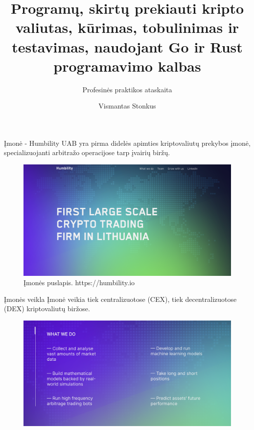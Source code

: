 \documentclass[12pt]{beamer}
\title[]{Programų, skirtų prekiauti kripto valiutas, kūrimas, tobulinimas ir testavimas, naudojant Go ir Rust programavimo kalbas}
\subtitle[]{Profesinės praktikos ataskaita}
\author[Vismantas Stonkus]{Vismantas Stonkus}
\date{}
\begin{document}
\begin{frame}
    \titlepage
\end{frame}

\begin{frame}{Įmonė - Humbility UAB}
yra pirma didelės apimties kriptovaliutų prekybos įmonė, specializuojanti arbitražo operacijose tarp įvairių biržų.

\begin{figure}[H]
  \centering
  \includegraphics[scale=0.2]{resources/site.png}
  \caption{Įmonės puslapis. https://humbility.io}
  \label{img:site}
\end{figure}
\end{frame}

\begin{frame}{Įmonės veikla}
Įmonė veikia tiek centralizuotose (CEX), tiek decentralizuotose (DEX) kriptovaliutų biržose.

  \begin{figure}[H]
    \centering
    \includegraphics[scale=0.3]{resources/whatwedo.png}
    \label{img:whatwedo}
  \end{figure}
\end{frame}
\end{document}
